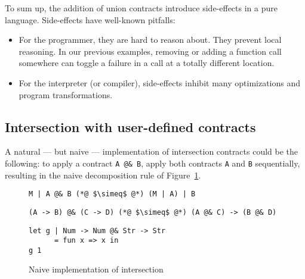 \documentclass[sigplan,10pt]{acmart}
\newcommand{\unsure}[2][1=]{}
\newcommand{\nickel}[1]{\lstinline[language=nickel]{#1}}
\begin{document}
\unsure{These arguments should go in the purity section}
To sum up, the addition of union contracts introduce side-effects in a pure
language. Side-effects have well-known pitfalls:
\begin{itemize}
    \item For the programmer, they are hard to reason about. They prevent local
        reasoning. In our previous examples, removing or adding a function call
        somewhere can toggle a failure in a call at a totally different
        location.
    \item For the interpreter (or compiler), side-effects inhibit many optimizations and
        program transformations.
\end{itemize}


%


\subsection{Intersection with user-defined contracts}
\label{sec:flat-and-inter}

A natural --- but naive --- implementation of intersection contracts could be the
following: to apply a contract \nickel{A @& B}, apply both contracts \nickel{A}
and \nickel{B} sequentially, resulting in the naive decomposition rule of
Figure~\ref{fig:naive-impl}.

\begin{figure}[h]
\begin{lstlisting}[language=nickel,frame=none,numbers=none,title={Naive
decomposition}]
M | A @& B (*@ $\simeq$ @*) (M | A) | B
\end{lstlisting}
\begin{lstlisting}[language=nickel,frame=none,numbers=none,title={Exchange law}]
(A -> B) @& (C -> D) (*@ $\simeq$ @*) (A @& C) -> (B @& D)
\end{lstlisting}
\begin{lstlisting}[language=nickel,title={Overloaded identity}]
let g | Num -> Num @& Str -> Str
      = fun x => x in
g 1
\end{lstlisting}
\caption{Naive implementation of intersection}
\label{fig:naive-impl}
\end{figure}
\end{document}
